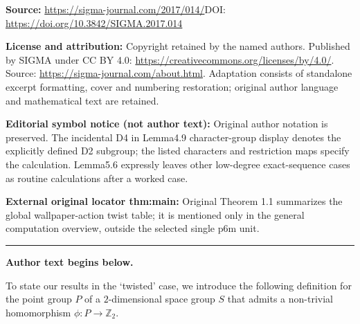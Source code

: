 \documentclass[11pt]{article}
\theoremstyle{definition}
\newcommand{\Z}{\mathbb{Z}}
\begin{document}
\noindent\textbf{Source:} \url{https://sigma-journal.com/2017/014/}\quad DOI: \url{https://doi.org/10.3842/SIGMA.2017.014}\par
\noindent\textbf{License and attribution:} Copyright retained by the named authors. Published by SIGMA under CC BY 4.0: \url{https://creativecommons.org/licenses/by/4.0/}. Source: \url{https://sigma-journal.com/about.html}. Adaptation consists of standalone excerpt formatting, cover and numbering restoration; original author language and mathematical text are retained.\par
\noindent\textbf{Editorial symbol notice (not author text):} Original author notation is preserved. The incidental D4 in Lemma4.9 character-group display denotes the explicitly defined D2 subgroup; the listed characters and restriction maps specify the calculation. Lemma5.6 expressly leaves other low-degree exact-sequence cases as routine calculations after a worked case.\par
\noindent\textbf{External original locator thm:main:} Original Theorem 1.1 summarizes the global wallpaper-action twist table; it is mentioned only in the general computation overview, outside the selected single p6m unit.\par
\medskip\hrule\medskip\noindent\textbf{Author text begins below.}\par
\setcounter{section}{1}
\setcounter{subsection}{0}
\setcounter{subsubsection}{0}
\setcounter{thm}{4}
\setcounter{equation}{0}
To state our results in the `twisted' case, we introduce the following def\/inition for the point group $P$ of a $2$-dimensional space group $S$ that admits a non-trivial homomorphism $\phi\colon P \to \Z_2$.
\end{document}
